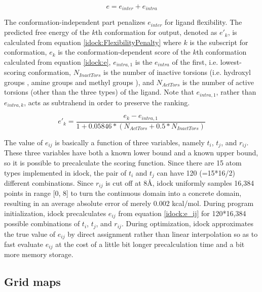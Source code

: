 \begin{equation}
\label{idock:inter+intra}
e = e_{inter} + e_{intra}
\end{equation}

The conformation-independent part penalizes $e_{inter}$ for ligand flexibility. The predicted free energy of the $k$th conformation for output, denoted as $e'_k$, is calculated from equation \eqref{idock:FlexibilityPenalty} where $k$ is the subscript for conformation, $e_k$ is the conformation-dependent score of the $k$th conformation calculated from equation \eqref{idock:e}, $e_{intra,1}$ is the $e_{intra}$ of the first, i.e. lowest-scoring conformation, $N_{InactTors}$ is the number of inactive torsions (i.e. hydroxyl groups , amine groups  and methyl groups ), and $N_{ActTors}$ is the number of active torsions (other than the three types) of the ligand. Note that $e_{intra,1}$, rather than $e_{intra,k}$, acts as subtrahend in order to preserve the ranking.

\begin{equation}
\label{idock:FlexibilityPenalty}
e'_k = \frac{e_k - e_{intra,1}}{1 + 0.05846 * (N_{ActTors} + 0.5 * N_{InactTors})}
\end{equation}

The value of $e_{ij}$ is basically a function of three variables, namely $t_i$, $t_j$, and $r_{ij}$. These three variables have both a known lower bound and a known upper bound, so it is possible to precalculate the scoring function. Since there are 15 atom types implemented in idock, the pair of $t_i$ and $t_j$ can have 120 (=15*16/2) different combinations. Since $r_{ij}$ is cut off at 8\AA, idock uniformly samples 16,384 points in range [0, 8] to turn the continuous domain into a concrete domain, resulting in an average absolute error of merely 0.002 kcal/mol. During program initialization, idock precalculates $e_{ij}$ from equation \eqref{idock:e_ij} for 120*16,384 possible combinations of $t_i$, $t_j$, and $r_{ij}$. During optimization, idock approximates the true value of $e_{ij}$ by direct assignment rather than linear interpolation so as to fast evaluate $e_{ij}$ at the cost of a little bit longer precalculation time and a bit more memory storage.

\subsection{Grid maps}

